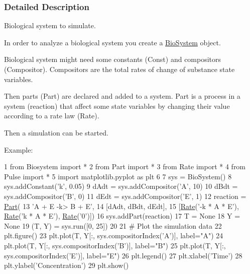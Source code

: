 \subsubsection{Detailed Description}
Biological system to simulate. 

In order to analyze a biological system you create a \hyperlink{classBiosystem_1_1BioSystem}{Bio\+System} object.

Biological system might need some constants (Const) and compositors (Compositor). Compositors are the total rates of change of substance state variables.

Then parts (Part) are declared and added to a system. Part is a process in a system (reaction) that affect some state variables by changing their value according to a rate law (Rate).

Then a simulation can be started.

Example\+:


\begin{DoxyCode}
1 \textcolor{keyword}{from} Biosystem \textcolor{keyword}{import} *
2 \textcolor{keyword}{from} Part \textcolor{keyword}{import} *
3 \textcolor{keyword}{from} Rate \textcolor{keyword}{import} *
4 \textcolor{keyword}{from} Pulse \textcolor{keyword}{import} *
5 \textcolor{keyword}{import} matplotlib.pyplot \textcolor{keyword}{as} plt
6 
7 sys = BioSystem()
8 sys.addConstant(\textcolor{stringliteral}{'k'}, 0.05)
9 dAdt = sys.addCompositor(\textcolor{stringliteral}{'A'}, 10)
10 dBdt = sys.addCompositor(\textcolor{stringliteral}{'B'}, 0)
11 dEdt = sys.addCompositor(\textcolor{stringliteral}{'E'}, 1)
12 reaction  = \hyperlink{namespacePart}{Part}(
13 \textcolor{stringliteral}{'A + E -k> B + E'},
14 [dAdt, dBdt, dEdt],
15 [\hyperlink{namespaceRate}{Rate}(\textcolor{stringliteral}{'-k * A * E'}), \hyperlink{namespaceRate}{Rate}(\textcolor{stringliteral}{'k * A * E'}), \hyperlink{namespaceRate}{Rate}(\textcolor{stringliteral}{'0'})])
16 sys.addPart(reaction)
17 T = \textcolor{keywordtype}{None}
18 Y = \textcolor{keywordtype}{None}
19 (T, Y) = sys.run([0, 25])
20 
21 \textcolor{comment}{# Plot the simulation data}
22 plt.figure()
23 plt.plot(T, Y[:, sys.compositorIndex(\textcolor{stringliteral}{'A'})], label=\textcolor{stringliteral}{"A"})
24 plt.plot(T, Y[:, sys.compositorIndex(\textcolor{stringliteral}{'B'})], label=\textcolor{stringliteral}{"B"})
25 plt.plot(T, Y[:, sys.compositorIndex(\textcolor{stringliteral}{'E'})], label=\textcolor{stringliteral}{"E"})
26 plt.legend()
27 plt.xlabel(\textcolor{stringliteral}{'Time'})
28 plt.ylabel(\textcolor{stringliteral}{'Concentration'})
29 plt.show()
\end{DoxyCode}


